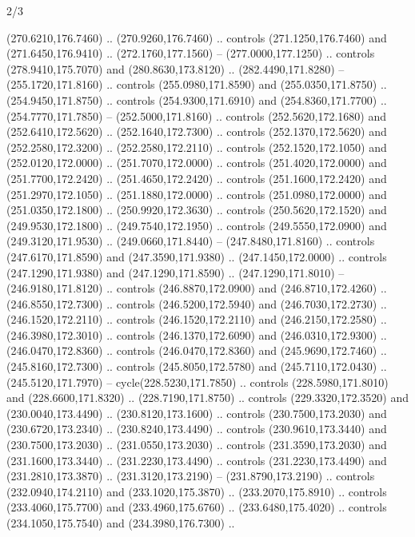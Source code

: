 \begin{flagdescription}{2/3}
\begin{scope}[xshift=0.5\flaglength,yshift=0.5\flagwidth,scale=\flagwidth/259.2]
\begin{scope}[y=0.8pt, x=0.8pt, yscale=-1,shift={(-243,-162)}]
      (270.6210,176.7460) .. (270.9260,176.7460) .. controls (271.1250,176.7460) and
      (271.6450,176.9410) .. (272.1760,177.1560) -- (277.0000,177.1250) .. controls
      (278.9410,175.7070) and (280.8630,173.8120) .. (282.4490,171.8280) --
      (255.1720,171.8160) .. controls (255.0980,171.8590) and (255.0350,171.8750) ..
      (254.9450,171.8750) .. controls (254.9300,171.6910) and (254.8360,171.7700) ..
      (254.7770,171.7850) -- (252.5000,171.8160) .. controls (252.5620,172.1680) and
      (252.6410,172.5620) .. (252.1640,172.7300) .. controls (252.1370,172.5620) and
      (252.2580,172.3200) .. (252.2580,172.2110) .. controls (252.1520,172.1050) and
      (252.0120,172.0000) .. (251.7070,172.0000) .. controls (251.4020,172.0000) and
      (251.7700,172.2420) .. (251.4650,172.2420) .. controls (251.1600,172.2420) and
      (251.2970,172.1050) .. (251.1880,172.0000) .. controls (251.0980,172.0000) and
      (251.0350,172.1800) .. (250.9920,172.3630) .. controls (250.5620,172.1520) and
      (249.9530,172.1800) .. (249.7540,172.1950) .. controls (249.5550,172.0900) and
      (249.3120,171.9530) .. (249.0660,171.8440) -- (247.8480,171.8160) .. controls
      (247.6170,171.8590) and (247.3590,171.9380) .. (247.1450,172.0000) .. controls
      (247.1290,171.9380) and (247.1290,171.8590) .. (247.1290,171.8010) --
      (246.9180,171.8120) .. controls (246.8870,172.0900) and (246.8710,172.4260) ..
      (246.8550,172.7300) .. controls (246.5200,172.5940) and (246.7030,172.2730) ..
      (246.1520,172.2110) .. controls (246.1520,172.2110) and (246.2150,172.2580) ..
      (246.3980,172.3010) .. controls (246.1370,172.6090) and (246.0310,172.9300) ..
      (246.0470,172.8360) .. controls (246.0470,172.8360) and (245.9690,172.7460) ..
      (245.8160,172.7300) .. controls (245.8050,172.5780) and (245.7110,172.0430) ..
      (245.5120,171.7970) -- cycle(228.5230,171.7850) .. controls
      (228.5980,171.8010) and (228.6600,171.8320) .. (228.7190,171.8750) .. controls
      (229.3320,172.3520) and (230.0040,173.4490) .. (230.8120,173.1600) .. controls
      (230.7500,173.2030) and (230.6720,173.2340) .. (230.8240,173.4490) .. controls
      (230.9610,173.3440) and (230.7500,173.2030) .. (231.0550,173.2030) .. controls
      (231.3590,173.2030) and (231.1600,173.3440) .. (231.2230,173.4490) .. controls
      (231.2230,173.4490) and (231.2810,173.3870) .. (231.3120,173.2190) --
      (231.8790,173.2190) .. controls (232.0940,174.2110) and (233.1020,175.3870) ..
      (233.2070,175.8910) .. controls (233.4060,175.7700) and (233.4960,175.6760) ..
      (233.6480,175.4020) .. controls (234.1050,175.7540) and (234.3980,176.7300) ..

\end{scope}
\end{scope}
\end{flagdescription}
